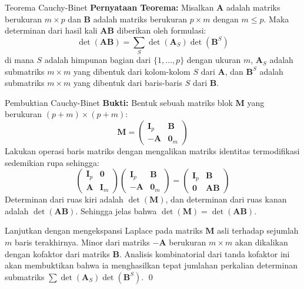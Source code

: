 \documentclass[aspectratio=169]{beamer}
\begin{document}
\begin{frame}{Teorema Cauchy-Binet}
  \textbf{Pernyataan Teorema:}
  Misalkan $\mathbf{A}$ adalah matriks berukuran $m \times p$ dan $\mathbf{B}$ adalah matriks berukuran $p \times m$ dengan $m \leqslant p$. Maka determinan dari hasil kali $\mathbf{AB}$ diberikan oleh formulasi:
  $$ \det(\mathbf{AB}) = \sum_{S} \det(\mathbf{A}_S) \det(\mathbf{B}^S) $$
  di mana $S$ adalah himpunan bagian dari $\{1, \dots, p\}$ dengan ukuran $m$, $\mathbf{A}_S$ adalah submatriks $m \times m$ yang dibentuk dari kolom-kolom $S$ dari $\mathbf{A}$, dan $\mathbf{B}^S$ adalah submatriks $m \times m$ yang dibentuk dari baris-baris $S$ dari $\mathbf{B}$.
\end{frame}

\begin{frame}{Pembuktian Cauchy-Binet}
  \textbf{Bukti:}
  Bentuk sebuah matriks blok $\mathbf{M}$ yang berukuran $(p+m) \times (p+m)$:
  $$ \mathbf{M} = \begin{pmatrix} \mathbf{I}_p & \mathbf{B} \\ -\mathbf{A} & \mathbf{0}_{m} \end{pmatrix} $$
  Lakukan operasi baris matriks dengan mengalikan matriks identitas termodifikasi sedemikian rupa sehingga:
  $$ \begin{pmatrix} \mathbf{I}_p & \mathbf{0} \\ \mathbf{A} & \mathbf{I}_m \end{pmatrix} \begin{pmatrix} \mathbf{I}_p & \mathbf{B} \\ -\mathbf{A} & \mathbf{0}_m \end{pmatrix} = \begin{pmatrix} \mathbf{I}_p & \mathbf{B} \\ \mathbf{0} & \mathbf{A}\mathbf{B} \end{pmatrix} $$
  Determinan dari ruas kiri adalah $\det(\mathbf{M})$, dan determinan dari ruas kanan adalah $\det(\mathbf{A}\mathbf{B})$. Sehingga jelas bahwa $\det(\mathbf{M}) = \det(\mathbf{A}\mathbf{B})$.

  Lanjutkan dengan mengekspansi Laplace pada matriks $\mathbf{M}$ asli terhadap sejumlah $m$ baris terakhirnya. Minor dari matriks $-\mathbf{A}$ berukuran $m \times m$ akan dikalikan dengan kofaktor dari matriks $\mathbf{B}$. Analisis kombinatorial dari tanda kofaktor ini akan membuktikan bahwa ia menghasilkan tepat jumlahan perkalian determinan submatriks $\sum \det(\mathbf{A}_S) \det(\mathbf{B}^S)$.
  \qed
\end{frame}
\end{document}
